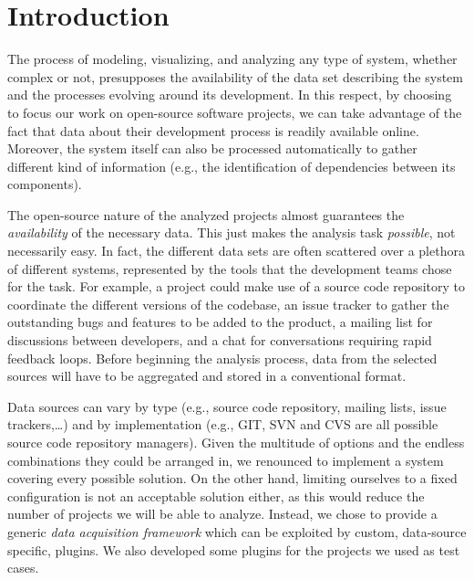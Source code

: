 
\section{Introduction}

The process of modeling, visualizing, and analyzing any type of system, whether complex or not, presupposes the availability of the data set describing the system and the processes evolving around its development. In this respect, by choosing to focus our work on open-source software projects, we can take advantage of the fact that data about their development process is readily available online. Moreover, the system itself can also be processed automatically to gather different kind of information (e.g., the identification of dependencies between its components).

The open-source nature of the analyzed projects almost guarantees the \emph{availability} of the necessary data. This just makes the analysis task \emph{possible}, not necessarily easy. In fact, the different data sets are often scattered over a plethora of different systems, represented by the tools that the development teams chose for the task. For example, a project could make use of a source code repository to coordinate the different versions of the codebase, an issue tracker to gather the outstanding bugs and features to be added to the product, a mailing list for discussions between developers, and a chat for conversations requiring rapid feedback loops. Before beginning the analysis process, data from the selected sources will have to be aggregated and stored in a conventional format.

Data sources can vary by type (e.g., source code repository, mailing lists, issue trackers,\ldots) and by implementation (e.g., GIT, SVN and CVS are all possible source code repository managers). Given the multitude of options and the endless combinations they could be arranged in, we renounced to implement a system covering every possible solution. On the other hand, limiting ourselves to a fixed configuration is not an acceptable solution either, as this would reduce the number of projects we will be able to analyze. Instead, we chose to provide a generic \emph{data acquisition framework} which can be exploited by custom, data-source specific, plugins. We also developed some plugins for the projects we used as test cases.

